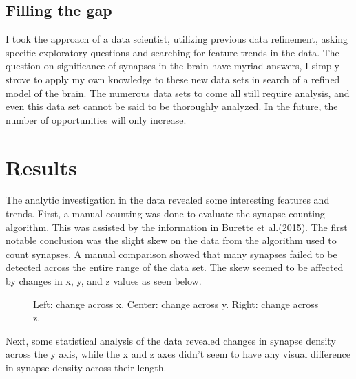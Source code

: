 \documentclass{article}
\begin{document}
\subsection{Filling the gap}

I took the approach of a data scientist, utilizing previous data refinement, asking specific exploratory questions and searching for feature trends in the data. The question on significance of synapses in the brain have myriad answers, I simply strove to apply my own knowledge to these new data sets in search of a refined model of the brain. The numerous data sets to come all still require analysis, and even this data set cannot be said to be thoroughly analyzed. In the future, the number of opportunities will only increase.

\section{Results}

The analytic investigation in the data revealed some interesting features and  trends. First, a manual counting was done to evaluate the synapse counting algorithm. This was assisted by the information in Burette et al.(2015). The first notable conclusion was the slight skew on the data from the algorithm used to count synapses. A manual comparison showed that many synapses failed to be detected across the entire range of the data set. The skew seemed to be affected by changes in x, y, and z values as seen below.

\begin{figure}[h]
  \centering
  \fbox{\rule[-.5cm]{0cm}{4cm} \rule[-.5cm]{4cm}{0cm}}
  \fbox{\rule[-.5cm]{0cm}{4cm} \rule[-.5cm]{4cm}{0cm}}
  \fbox{\rule[-.5cm]{0cm}{4cm} \rule[-.5cm]{4cm}{0cm}}
  \caption{Left: change across x. Center: change across y. Right: change across z.}
\end{figure}

Next, some statistical analysis of the data revealed changes in synapse density across the y axis, while the x and z axes didn't seem to have any visual difference in synapse density across their length.
\end{document}

